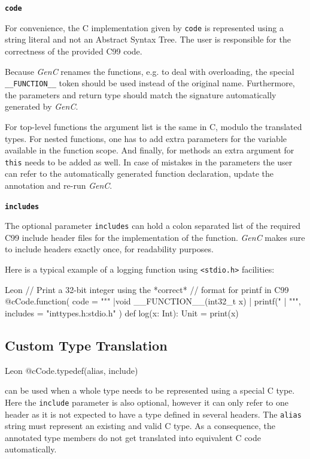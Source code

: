 \documentclass[a4paper,twoside]{article}
\newcommand{\Inline}[1]{\lstinline[basicstyle=\ttfamily]|#1|}
\newcommand{\InlineC}[1]{\lstinline[language=C99]|#1|}
\newcommand{\InlineS}[1]{\lstinline[language=Leon]|#1|}
\newcommand*{\lstitem}[1]{
  \setbox0\hbox{\textbf{\Inline{#1}}}
  \item[\usebox0]
}
\newcommand{\GenC}{\emph{GenC}\xspace}
\begin{document}
\begin{description}

\lstitem{code}

For convenience, the C implementation given by \InlineS{code} is represented
using a string literal and not an Abstract Syntax Tree. The user is responsible
for the correctness of the provided C99 code.

Because \GenC renames the functions, e.g. to deal with overloading, the special
\InlineC{__FUNCTION__} token should be used instead of the original name.
Furthermore, the parameters and return type should match the signature
automatically generated by \GenC.

For top-level functions the argument list is the same in C, modulo the
translated types. For nested functions, one has to add extra parameters for the
variable available in the function scope. And finally, for methods an extra
argument for \InlineS{this} needs to be added as well. In case of mistakes in
the parameters the user can refer to the automatically generated function
declaration, update the annotation and re-run \GenC.

\lstitem{includes}

The optional parameter \InlineS{includes} can hold a colon separated list of the
required C99 include header files for the implementation of the function. \GenC
makes sure to include headers exactly once, for readability purposes.

\end{description}

\pagebreak[4]
Here is a typical example of a logging function using \InlineC{<stdio.h>}
facilities:

\begin{ShortCode}{Leon}
// Print a 32-bit integer using the *correct*
// format for printf in C99
@cCode.function(
  code = """
    |void __FUNCTION__(int32_t x) {
    |  printf("%
    |}
    """,
  includes = "inttypes.h:stdio.h"
)
def log(x: Int): Unit = {
  print(x)
}
\end{ShortCode}

\subsection{Custom Type Translation}

\begin{ShortCode}{Leon}
@cCode.typedef(alias, include)
\end{ShortCode}
can be used when a whole type needs to be represented using a special C type.
Here the \InlineS{include} parameter is also optional, however it can only refer
to one header as it is not expected to have a type defined in several headers.
The \InlineS{alias} string must represent an existing and valid C type. As a
consequence, the annotated type members do not get translated into equivalent C
code automatically.
\end{document}
